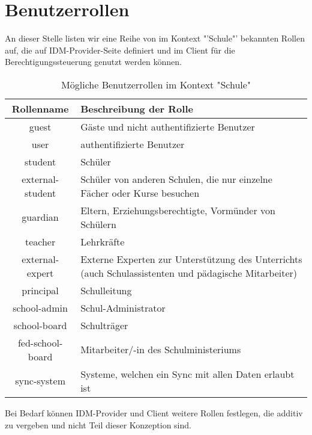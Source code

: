 \section{Benutzerrollen}
\label{Benutzerrollen}
An dieser Stelle listen wir eine Reihe von im Kontext "'Schule"' bekannten Rollen auf, die auf IDM-Provider-Seite definiert und im Client für die Berechtigungssteuerung genutzt werden können.
\\


\begin{table}[htb]
	\begin{tabularx}{\textwidth}{|c|X|}
		\hline
\textbf{Rollenname} & \textbf{Beschreibung der Rolle} \\ \hline
guest & Gäste und nicht authentifizierte Benutzer \\ \hline
user & authentifizierte Benutzer \\ \hline
student & Schüler \\ \hline
external-student & Schüler von anderen Schulen, die nur einzelne Fächer oder Kurse besuchen \\ \hline
guardian & Eltern, Erziehungsberechtigte, Vormünder von Schülern \\ \hline
teacher & Lehrkräfte \\ \hline
external-expert & Externe Experten zur Unterstützung des Unterrichts (auch Schulassistenten und pädagische Mitarbeiter) \\ \hline
principal & Schulleitung \\ \hline
school-admin & Schul-Administrator \\ \hline
school-board & Schulträger \\ \hline
fed-school-board & Mitarbeiter/-in des Schulministeriums \\ \hline
sync-system & Systeme, welchen ein Sync mit allen Daten erlaubt ist \\ \hline

	\end{tabularx}

		\caption{Mögliche Benutzerrollen im Kontext "Schule"}
		\label{tab:intro:roles}
\end{table}

Bei Bedarf können IDM-Provider und Client weitere Rollen festlegen, die additiv zu vergeben und nicht Teil dieser Konzeption sind.
